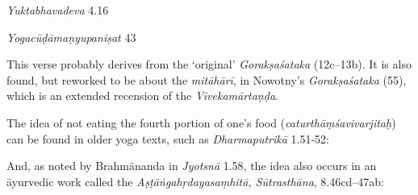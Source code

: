 \begin{ekdosis}
\begin{testimonia}[hp01_058]
\emph{Yuktabhavadeva} 4.16

\begin{versinnote}
\end{versinnote}

\emph{Yogacūḍāmaṇyupaniṣat} 43

\begin{versinnote}
\end{versinnote}

\end{testimonia}

\begin{philcomm}[hp01_058]
This verse probably derives from the ‘original’ \emph{Gorakṣaśataka} (12c–13b). It is also found, but reworked to be about the \emph{mitāhārī}, in Nowotny’s \emph{Gorakṣaśataka} (55), which is an extended recension of the \emph{Vivekamārtaṇḍa}. 

The idea of not eating the fourth portion of one’s food (\emph{caturthāṃśavivarjitaḥ}) can be found in older yoga texts, such as \emph{Dharmaputrikā} 1.51-52:

\begin{versinnote}
\end{versinnote}

And, as noted by Brahmānanda in \emph{Jyotsnā} 1.58, the idea also occurs in an āyurvedic work called the \emph{Aṣṭāṅgahṛdayasaṃhitā, Sūtrasthāna}, 8.46cd–47ab: 

\begin{versinnote}
\end{versinnote} 


\end{philcomm}
\end{ekdosis}
